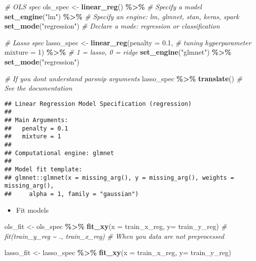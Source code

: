 \documentclass[
]{book}
\newenvironment{Shaded}{\begin{snugshade}}{\end{snugshade}}
\newcommand{\CommentTok}[1]{\textcolor[rgb]{0.56,0.35,0.01}{\textit{#1}}}
\newcommand{\DataTypeTok}[1]{\textcolor[rgb]{0.13,0.29,0.53}{#1}}
\newcommand{\DecValTok}[1]{\textcolor[rgb]{0.00,0.00,0.81}{#1}}
\newcommand{\FloatTok}[1]{\textcolor[rgb]{0.00,0.00,0.81}{#1}}
\newcommand{\KeywordTok}[1]{\textcolor[rgb]{0.13,0.29,0.53}{\textbf{#1}}}
\newcommand{\NormalTok}[1]{#1}
\newcommand{\OperatorTok}[1]{\textcolor[rgb]{0.81,0.36,0.00}{\textbf{#1}}}
\newcommand{\StringTok}[1]{\textcolor[rgb]{0.31,0.60,0.02}{#1}}
\providecommand{\tightlist}{%
  \setlength{\itemsep}{0pt}\setlength{\parskip}{0pt}}
\begin{document}
\begin{Shaded}
\begin{Highlighting}[]
\CommentTok{\# OLS spec }
\NormalTok{ols\_spec \textless{}{-}}\StringTok{ }\KeywordTok{linear\_reg}\NormalTok{() }\OperatorTok{\%\textgreater{}\%}\StringTok{ }\CommentTok{\# Specify a model }
\StringTok{  }\KeywordTok{set\_engine}\NormalTok{(}\StringTok{"lm"}\NormalTok{) }\OperatorTok{\%\textgreater{}\%}\StringTok{ }\CommentTok{\# Specify an engine: lm, glmnet, stan, keras, spark }
\StringTok{  }\KeywordTok{set\_mode}\NormalTok{(}\StringTok{"regression"}\NormalTok{) }\CommentTok{\# Declare a mode: regression or classification }

\CommentTok{\# Lasso spec }
\NormalTok{lasso\_spec \textless{}{-}}\StringTok{ }\KeywordTok{linear\_reg}\NormalTok{(}\DataTypeTok{penalty =} \FloatTok{0.1}\NormalTok{, }\CommentTok{\# tuning hyperparameter }
                         \DataTypeTok{mixture =} \DecValTok{1}\NormalTok{) }\OperatorTok{\%\textgreater{}\%}\StringTok{ }\CommentTok{\# 1 = lasso, 0 = ridge }
\StringTok{  }\KeywordTok{set\_engine}\NormalTok{(}\StringTok{"glmnet"}\NormalTok{) }\OperatorTok{\%\textgreater{}\%}
\StringTok{  }\KeywordTok{set\_mode}\NormalTok{(}\StringTok{"regression"}\NormalTok{) }

\CommentTok{\# If you don\textquotesingle{}t understand parsnip arguments }
\NormalTok{lasso\_spec }\OperatorTok{\%\textgreater{}\%}\StringTok{ }\KeywordTok{translate}\NormalTok{() }\CommentTok{\# See the documentation}
\end{Highlighting}
\end{Shaded}

\begin{verbatim}
## Linear Regression Model Specification (regression)
## 
## Main Arguments:
##   penalty = 0.1
##   mixture = 1
## 
## Computational engine: glmnet 
## 
## Model fit template:
## glmnet::glmnet(x = missing_arg(), y = missing_arg(), weights = missing_arg(), 
##     alpha = 1, family = "gaussian")
\end{verbatim}

\begin{itemize}
\tightlist
\item
  Fit models
\end{itemize}

\begin{Shaded}
\begin{Highlighting}[]
\NormalTok{ols\_fit \textless{}{-}}\StringTok{ }\NormalTok{ols\_spec }\OperatorTok{\%\textgreater{}\%}
\StringTok{  }\KeywordTok{fit\_xy}\NormalTok{(}\DataTypeTok{x =}\NormalTok{ train\_x\_reg, }\DataTypeTok{y=}\NormalTok{ train\_y\_reg) }
  \CommentTok{\# fit(train\_y\_reg \textasciitilde{} ., train\_x\_reg) \# When you data are not preprocessed }

\NormalTok{lasso\_fit \textless{}{-}}\StringTok{ }\NormalTok{lasso\_spec }\OperatorTok{\%\textgreater{}\%}
\StringTok{  }\KeywordTok{fit\_xy}\NormalTok{(}\DataTypeTok{x =}\NormalTok{ train\_x\_reg, }\DataTypeTok{y=}\NormalTok{ train\_y\_reg) }
\end{Highlighting}
\end{Shaded}
\end{document}

